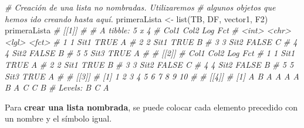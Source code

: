 \documentclass[
]{article}
\newenvironment{Shaded}{\begin{snugshade}}{\end{snugshade}}
\newcommand{\AttributeTok}[1]{\textcolor[rgb]{0.77,0.63,0.00}{#1}}
\newcommand{\CommentTok}[1]{\textcolor[rgb]{0.56,0.35,0.01}{\textit{#1}}}
\newcommand{\FunctionTok}[1]{\textcolor[rgb]{0.00,0.00,0.00}{#1}}
\newcommand{\NormalTok}[1]{#1}
\newcommand{\OtherTok}[1]{\textcolor[rgb]{0.56,0.35,0.01}{#1}}
\theoremstyle{definition}
\theoremstyle{definition}
\theoremstyle{definition}
\theoremstyle{definition}
\theoremstyle{remark}
\begin{document}
\begin{Shaded}
\begin{Highlighting}[]
\CommentTok{\# Creación de una lista no nombradas. Utilizaremos}
\CommentTok{\# algunos objetos que hemos ido creando hasta aquí.}
\NormalTok{primeraLista }\OtherTok{\textless{}{-}} \FunctionTok{list}\NormalTok{(TB, DF, vector1, F2)}
\NormalTok{primeraLista}
\CommentTok{\# [[1]]}
\CommentTok{\# \# A tibble: 5 x 4}
\CommentTok{\#    Col1 Col2  Log   Fct  }
\CommentTok{\#   \textless{}int\textgreater{} \textless{}chr\textgreater{} \textless{}lgl\textgreater{} \textless{}fct\textgreater{}}
\CommentTok{\# 1     1 Sit1  TRUE  A    }
\CommentTok{\# 2     2 Sit1  TRUE  B    }
\CommentTok{\# 3     3 Sit2  FALSE C    }
\CommentTok{\# 4     4 Sit2  FALSE B    }
\CommentTok{\# 5     5 Sit3  TRUE  A    }
\CommentTok{\# }
\CommentTok{\# [[2]]}
\CommentTok{\#   Col1 Col2   Log Fct}
\CommentTok{\# 1    1 Sit1  TRUE   A}
\CommentTok{\# 2    2 Sit1  TRUE   B}
\CommentTok{\# 3    3 Sit2 FALSE   C}
\CommentTok{\# 4    4 Sit2 FALSE   B}
\CommentTok{\# 5    5 Sit3  TRUE   A}
\CommentTok{\# }
\CommentTok{\# [[3]]}
\CommentTok{\#  [1]  1  2  3  4  5  6  7  8  9 10}
\CommentTok{\# }
\CommentTok{\# [[4]]}
\CommentTok{\#  [1] A B A A A A B A C C B}
\CommentTok{\# Levels: B C A}
\end{Highlighting}
\end{Shaded}

Para \textbf{crear una lista nombrada}, se puede colocar cada elemento precedido con un nombre y el símbolo igual.

\begin{Shaded}
\end{Shaded}
\end{document}

